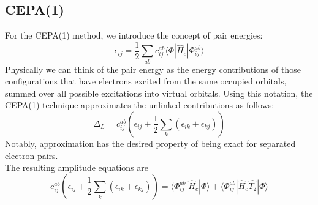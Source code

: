 \documentclass{article}[11pt]
\begin{document}

\subsection*{CEPA(1)}

For the  CEPA(1) method, we introduce the concept of pair energies:
\begin{equation*} 
   \epsilon_{ij}
=
   \frac{1}{2}
   \sum\limits_{ab}
   c_{ij}^{ab}
   \langle \Phi |
      \hat{H}_{{c}}
   | \Phi_{ij}^{ab} \rangle
\end{equation*}
Physically we can think of the pair energy as the energy contributions of those configurations that have electrons excited from the same occupied orbitals, summed over all possible excitations into virtual orbitals. \vspace{0.2cm}
Using this notation, the CEPA(1) technique approximates the unlinked contributions as follows:
\begin{equation*}
      \Delta_{{L}} 
=
   c_{ij}^{ab}
   \left(
   \epsilon_{ij} 
+
   \frac{1}{2}
   \sum\limits_{k}
      \left(
        \epsilon_{ik}
        +
        \epsilon_{kj}
      \right)
   \right)
\end{equation*}
Notably, approximation has the desired property of being exact for separated electron pairs. \vspace{0.2cm} \\
The resulting amplitude equations are
\begin{equation}
    c_{ij}^{ab}
    \left(
   \epsilon_{ij} 
+
   \frac{1}{2}
   \sum\limits_{k}
      \left(
        \epsilon_{ik}
        +
        \epsilon_{kj}
      \right)
   \right)
= 
   \langle \Phi_{ij}^{ab} |
      \hat{H}_c 
   | \Phi \rangle
+
   \langle \Phi_{ij}^{ab} |
      \hat{H}_c
      \hat{T_2}
   | \Phi \rangle
\end{equation}
\end{document}
